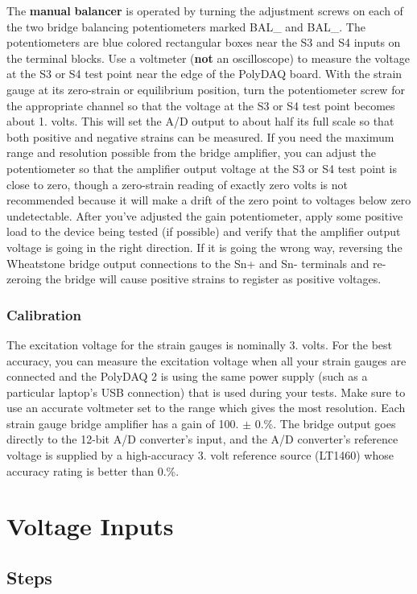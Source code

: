 The {\bfseries manual} {\bfseries balancer} is operated by turning the adjustment screws on each of the two bridge balancing potentiometers marked {\ttfamily B\-A\-L\-\_} and {\ttfamily B\-A\-L\-\_}. The potentiometers are blue colored rectangular boxes near the {\ttfamily S3} and {\ttfamily S4} inputs on the terminal blocks. Use a voltmeter ({\bfseries not} an oscilloscope) to measure the voltage at the {\ttfamily S3} or {\ttfamily S4} test point near the edge of the Poly\-D\-A\-Q board. With the strain gauge at its zero-\/strain or equilibrium position, turn the potentiometer screw for the appropriate channel so that the voltage at the {\ttfamily S3} or {\ttfamily S4} test point becomes about 1. volts. This will set the A/\-D output to about half its full scale so that both positive and negative strains can be measured. If you need the maximum range and resolution possible from the bridge amplifier, you can adjust the potentiometer so that the amplifier output voltage at the {\ttfamily S3} or {\ttfamily S4} test point is close to zero, though a zero-\/strain reading of exactly zero volts is not recommended because it will make a drift of the zero point to voltages below zero undetectable. After you've adjusted the gain potentiometer, apply some positive load to the device being tested (if possible) and verify that the amplifier output voltage is going in the right direction. If it is going the wrong way, reversing the Wheatstone bridge output connections to the {\ttfamily Sn+} and {\ttfamily Sn-\/} terminals and re-\/zeroing the bridge will cause positive strains to register as positive voltages.\hypertarget{pd_sensors_sg_calib}{}\subsubsection{Calibration}\label{pd_sensors_sg_calib}
The excitation voltage for the strain gauges is nominally 3. volts. For the best accuracy, you can measure the excitation voltage when all your strain gauges are connected and the Poly\-D\-A\-Q 2 is using the same power supply (such as a particular laptop's U\-S\-B connection) that is used during your tests. Make sure to use an accurate voltmeter set to the range which gives the most resolution. Each strain gauge bridge amplifier has a gain of 100. $\pm$ 0.\%. The bridge output goes directly to the 12-\/bit A/\-D converter's input, and the A/\-D converter's reference voltage is supplied by a high-\/accuracy 3. volt reference source (L\-T1460) whose accuracy rating is better than 0.\%.\hypertarget{pd_sensors_sec_vin}{}\section{Voltage Inputs}\label{pd_sensors_sec_vin}
\hypertarget{pd_sensors_ss_vin_steps}{}\subsection{Steps}\label{pd_sensors_ss_vin_steps}

